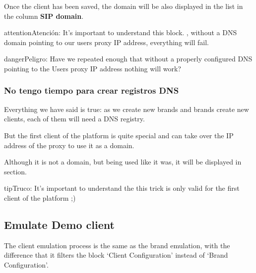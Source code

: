 \documentclass[letterpaper,10pt,spanish]{sphinxmanual}
\begin{document}
Once the client has been saved, the domain will be also displayed in the list in the column \textbf{SIP domain}.

\begin{notice}{attention}{Atención:}
It's important to understand this block. {\hyperref[getting_started/internal_calls/brand_portal:dnshack]{}}, without a DNS domain pointing to our
users proxy IP address, everything will fail.
\end{notice}

\begin{notice}{danger}{Peligro:}
Have we repeated enough that without a properly configured DNS
pointing to the Users proxy IP address nothing will work?
\end{notice}


\subsubsection{No tengo tiempo para crear registros DNS}
\label{getting_started/internal_calls/brand_portal:dnshack}\label{getting_started/internal_calls/brand_portal:i-have-no-time-for-a-dns-registry}
Everything we have said is true: as we create new brands and brands create new
clients, each of them will need a DNS registry.

But the first client of the platform is quite special and can take over the IP
address of the proxy to use it as a domain.

Although it is not a domain, but being used like it was, it will be displayed
in {\hyperref[administration_portal/platform/sip_domains:sip\string-domains]{}} section.

\begin{notice}{tip}{Truco:}
It’s important to understand the this trick is only valid for the first
client of the platform ;)
\end{notice}


\subsection{Emulate Demo client}
\label{getting_started/internal_calls/brand_portal:emulate-client}\label{getting_started/internal_calls/brand_portal:emulate-demo-client}
The client emulation process is the same as the brand emulation, with the
difference that it filters the block ‘Client Configuration’ instead of
‘Brand Configuration’.
\end{document}
